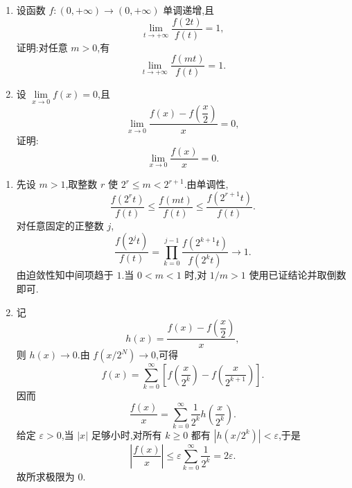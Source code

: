 \begin{example}
    \begin{enumerate}
        \item 设函数 $f:(0,+\infty)\to(0,+\infty)$ 单调递增,且
              \[
                  \lim\limits_{t\to+\infty}\dfrac{f(2t)}{f(t)}=1,
              \]
              证明:对任意 $m>0$,有
              \[
                  \lim\limits_{t\to+\infty}\dfrac{f(mt)}{f(t)}=1.
              \]
        \item 设 $\displaystyle\lim\limits_{x\to0}f(x)=0$,且
              \[
                  \lim\limits_{x\to0}\dfrac{f(x)-f\left(\dfrac{x}{2}\right)}{x}=0,
              \]
              证明:
              \[
                  \lim\limits_{x\to0}\dfrac{f(x)}{x}=0.
              \]
    \end{enumerate}
\end{example}
\exampleblank

\begin{solution}
    \begin{enumerate}
        \item 先设 $m>1$,取整数 $r$ 使 $2^r\leq m<2^{r+1}$.由单调性,
              \[
                  \dfrac{f(2^rt)}{f(t)}
                  \leq\dfrac{f(mt)}{f(t)}
                  \leq\dfrac{f(2^{r+1}t)}{f(t)}.
              \]
              对任意固定的正整数 $j$,
              \[
                  \dfrac{f(2^jt)}{f(t)}
                  =\prod\limits_{k=0}^{j-1}\dfrac{f(2^{k+1}t)}{f(2^kt)}
                  \longrightarrow1.
              \]
              由迫敛性知中间项趋于 $1$.当 $0<m<1$ 时,对 $1/m>1$ 使用已证结论并取倒数即可.
        \item 记
              \[
                  h(x)=\dfrac{f(x)-f\left(\dfrac{x}{2}\right)}{x},
              \]
              则 $h(x)\to0$.由 $f(x/2^N)\to0$,可得
              \[
                  f(x)=\sum\limits_{k=0}^{\infty}
                  \left[f\left(\dfrac{x}{2^k}\right)-f\left(\dfrac{x}{2^{k+1}}\right)\right].
              \]
              因而
              \[
                  \dfrac{f(x)}{x}
                  =\sum\limits_{k=0}^{\infty}\dfrac{1}{2^k}h\left(\dfrac{x}{2^k}\right).
              \]
              给定 $\varepsilon>0$,当 $|x|$ 足够小时,对所有 $k\geq0$ 都有
              $\left|h\left(x/2^k\right)\right|<\varepsilon$,于是
              \[
                  \left|\dfrac{f(x)}{x}\right|
                  \leq\varepsilon\sum\limits_{k=0}^{\infty}\dfrac{1}{2^k}
                  =2\varepsilon.
              \]
              故所求极限为 $0$.
    \end{enumerate}
\end{solution}


